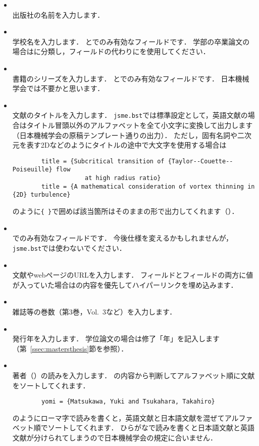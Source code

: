 \documentclass[a4paper,fleqn,uplatex,dvipdfmx]{jsarticle}
\newcommand{\jsmefile}{\texttt{jsme.bst}}
\begin{document}
\begin{itemize}
    \item \ttpublisher \\
        出版社の名前を入力します．
    \item \ttschool \\
        学校名を入力します．
        \hyperref[ssec:mastersthesis]{\ttmastersthesis}と\hyperref[ssec:phdthesis]{\ttphdthesis}でのみ有効なフィールドです．
        学部の卒業論文の場合は\hyperref[ssec:misc]{\ttmisc}に分類し，\ttschool フィールドの代わりに\tthowpublished を使用してください．
    \item \ttseries \\
        書籍のシリーズを入力します．
        \hyperref[ssec:book]{\ttbook}と\hyperref[ssec:inbook]{\ttinbook}でのみ有効なフィールドです．
        日本機械学会では不要かと思います．
    \item \tttitle \\
        文献のタイトルを入力します．
        \jsmefile では標準設定として，英語文献の場合はタイトル冒頭以外のアルファベットを全て小文字に変換して出力します（日本機械学会の原稿テンプレート通りの出力）．
        ただし，固有名詞や二次元を表す2Dなどのようにタイトルの途中で大文字を使用する場合は
        \begin{verbatim}
        title = {Subcritical transition of {Taylor--Couette--Poiseuille} flow 
                    at high radius ratio}
        title = {A mathematical consideration of vortex thinning in {2D} turbulence}
        \end{verbatim}
        のように\verb|{ }|で囲めば該当箇所はそのままの形で出力してくれます（\citealp{Matsukawa:PoF2022,Yoneda:arXiv2016}）．
    \item \tttype \\
        \hyperref[ssec:techreport]{\tttechreport}でのみ有効なフィールドです．
        今後仕様を変えるかもしれませんが，\jsmefile では使わないでください．
    \item \tturl \\
        文献やwebページのURLを入力します．
        \ttdoi フィールドと\tturl フィールドの両方に値が入っていた場合は\ttdoi の内容を優先してハイパーリンクを埋め込みます．
    \item \ttvolume \\
        雑誌等の巻数（第3巻，Vol.~3など）を入力します．
    \item \ttyear \\
        発行年を入力します．
        学位論文の場合は修了「年」を記入します（第~\ref{ssec:mastersthesis}節\ttmastersthesis を参照）．
    \item \ttyomi \\
        著者（\ttauthor）の読みを入力します．
        \ttyomi の内容から判断してアルファベット順に文献をソートしてくれます．
        \begin{verbatim}
        yomi = {Matsukawa, Yuki and Tsukahara, Takahiro}
        \end{verbatim}
        のようにローマ字で読みを書くと，英語文献と日本語文献を混ぜてアルファベット順でソートしてくれます．
        ひらがなで読みを書くと日本語文献と英語文献が分けられてしまうので日本機械学会の規定に合いません．
\end{itemize}
\end{document}
